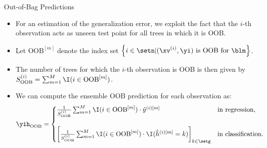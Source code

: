 \documentclass[11pt,compress,t,notes=noshow, xcolor=table]{beamer}
\begin{document}

\begin{vbframe}{Out-of-Bag Predictions}

\footnotesize

\begin{itemize}
  \item For an estimation of the generalization error, we exploit the 
  fact that the $i$-th observation acts as unseen test point for all trees in 
  which it is OOB. 
  \item Let $\text{OOB}^{[m]}$ denote the index set 
  $\left \{i \in \setn | (\xv^{(i)}, \yi) \text{ is OOB for } \blm \right \}$.
  \item The number of trees for which the $i$-th observation is OOB is then 
  given by $S_{\text{OOB}}^{(i)} = 
  \sum_{m = 1}^M \I(i \in \text{OOB}^{[m]})$.
  \item We can compute the ensemble OOB prediction for each observation as:
  $$\yih_{\text{OOB}} = \begin{cases}
  \frac{1}{S_{\text{OOB}}^{(i)}} \sum_{m = 1}^{M}
  \I(i \in \text{OOB}^{[m]}) \cdot \hat{y}^{(i)[m]}
  & \text{in regression,} \\
  \phantom{x} \\
  \left[
  \frac{1}{S_{\text{OOB}}^{(i)}} \sum_{m = 1}^{M} \I(i \in \text{OOB}^{[m]})
  \cdot \I(\hat{h}^{(i)[m]} = k) \right]_{k \in \setg} &
  \text{in classification.}
  \end{cases}$$
\end{itemize}

\vspace{0.3cm}


\end{vbframe}
\end{document}
